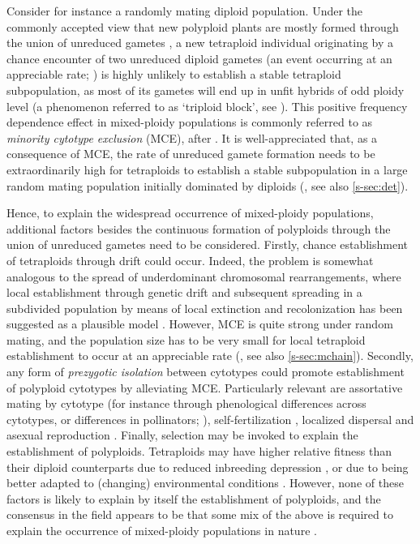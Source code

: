 \documentclass[12pt,a4paper]{article}
\begin{document}
    Consider for instance a randomly mating diploid population.
    Under the commonly accepted view that new polyploid plants are mostly formed
    through the union of unreduced gametes
    \citep{bretagnolle1995,herben2016,kreiner2017b}, a new tetraploid individual
    originating by a chance encounter of two unreduced diploid gametes (an event
    occurring at an appreciable rate; \cite{kreiner2017}) is highly unlikely to
    establish a stable tetraploid subpopulation, as most of its gametes will end up
    in unfit hybrids of odd ploidy level (a phenomenon referred to as `triploid
    block', see \cite{ramsey1998,kohler2010,brown2024}).
    This positive frequency dependence effect in mixed-ploidy populations is
    commonly referred to as \textit{minority cytotype exclusion} (MCE), after
    \cite{levin1975}.
    It is well-appreciated that, as a consequence of MCE, the rate of unreduced
    gamete formation needs to be extraordinarily high for tetraploids to establish
    a stable subpopulation in a large random mating population initially dominated
    by diploids (\cite{felber1997}, see also \cref{s-sec:det}).

    Hence, to explain the widespread occurrence of mixed-ploidy populations,
    additional factors besides the continuous formation of polyploids through the
    union of unreduced gametes need to be considered.
    Firstly, chance establishment of tetraploids through drift could occur.
    Indeed, the problem is somewhat analogous to the spread of underdominant
    chromosomal rearrangements, where local establishment through genetic drift and
    subsequent spreading in a subdivided population by means of local extinction
    and recolonization has been suggested as a plausible model \citep{lande1985}.
    However, MCE is quite strong under random mating, and the population size has
    to be very small for local tetraploid establishment to occur at an appreciable
    rate (\cite{rausch2005}, see also \cref{s-sec:mchain}).
    Secondly, any form of \textit{prezygotic isolation} between cytotypes could
    promote establishment of polyploid cytotypes by alleviating MCE.
    Particularly relevant are assortative mating by cytotype  (for instance through
    phenological differences across cytotypes, or differences in pollinators;
    \cite{husband2004,kolar2017}), self-fertilization \citep{rausch2005,novikova2023}, 
    localized dispersal \citep{baack2005,kolar2017} and asexual reproduction
    \citep{vandrunen2022}.
    Finally, selection may be invoked to explain the establishment of polyploids.
    Tetraploids may have higher relative fitness than their diploid counterparts
    due to reduced inbreeding depression
    \citep{husband1997,ronfort1999,otto2000,husband2004,husband2008,clo2022b}, or due to being
    better adapted to (changing) environmental conditions \citep{vandepeer2021}. 
    However, none of these factors is likely to explain by itself the establishment
    of polyploids, and the consensus in the field appears to be that some mix of
    the above is required to explain the occurrence of mixed-ploidy populations in
    nature \citep{kolar2017,mortier2024}.
\end{document}
